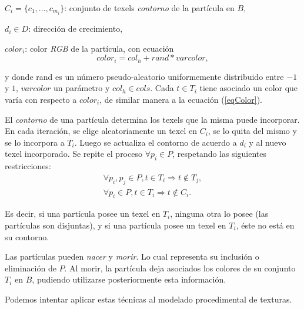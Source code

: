 \documentclass[spanish,a4paper,11pt,oneside,links]{report}
\begin{document}
$C_{i} = \{c_{1}, ... , c_{m_{i}}\}$: conjunto de texels {\em contorno} de la part\'icula en $B$,

$d_{i} \in D$: direcci\'on de crecimiento,

$color_{i}$: color {\em RGB} de la part\'icula, con ecuaci\'on \cite{Reeves83}
\begin{equation}
color_{i} = col_{h} + rand * varcolor,
\label{eqColor}
\end{equation}

\noindent
y donde rand es un n\'umero pseudo-aleatorio uniformemente distribuido entre $-1$ y $1$, $varcolor$ un par\'ametro y $col_{h} \in cols$. Cada $t \in T_{i}$ tiene asociado un color que var\'ia con respecto a $color_{i}$, de similar manera a la ecuaci\'on (\ref{eqColor}).

El {\em contorno} de una part\'icula determina los texels que la misma puede incorporar. En cada iteraci\'on, se elige aleatoriamente un texel en $C_{i}$, se lo quita del mismo y se lo incorpora a $T_{i}$. Luego se actualiza el contorno de acuerdo a $d_{i}$ y al nuevo texel incorporado. Se repite el proceso $\forall p_{i} \in P$, respetando las siguientes restricciones:
\begin{eqnarray}
\forall p_{i}, p_{j} \in P, t \in T_{i} \Rightarrow t \notin T_{j}, \\
\forall p_{i} \in P, t \in T_{i} \Rightarrow t \notin C_{i}.
\end{eqnarray}

Es decir, si una part\'icula posee un texel en $T_{i}$, ninguna otra lo posee (las part\'iculas son disjuntas), y si una part\'icula posee un texel en $T_{i}$, \'este no est\'a en su contorno.

Las part\'iculas pueden {\em nacer} y {\em morir}. Lo cual representa su inclusi\'on o eliminaci\'on de $P$. Al morir, la part\'icula deja asociados los colores de su conjunto $T_{i}$ en $B$, pudiendo utilizarse posteriormente esta informaci\'on.

Podemos intentar aplicar estas técnicas al modelado procedimental de texturas. 
\end{document}
